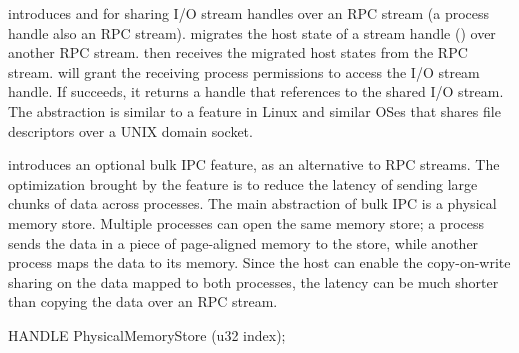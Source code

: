 \Thehostabi{} introduces  and  for sharing I/O stream handles over an RPC stream (a process handle also an RPC stream).
migrates the host state of a stream handle ()
over another RPC stream.
then receives the migrated host states from the RPC stream.
will grant the receiving process permissions to access the I/O stream handle. %
If  succeeds, it returns a handle
that references to the shared I/O stream.
The abstraction is similar to a feature in Linux and similar OSes that
shares file descriptors over a UNIX domain socket.






\Thehostabi{} introduces an optional bulk IPC feature, as an alternative to RPC streams.
The optimization brought
by the feature
is to reduce the latency of sending large chunks of data across processes.
The main abstraction of bulk IPC is a physical memory store.
Multiple processes can open the same memory store;
a process sends the data in a piece of page-aligned memory to the store,
while another process maps the data to its memory.
Since the host can enable the copy-on-write sharing on the data mapped to both processes,
the latency can be much shorter than copying the data over an RPC stream.




\begin{paldef}
HANDLE PhysicalMemoryStore  (u32 index);
\end{paldef}


